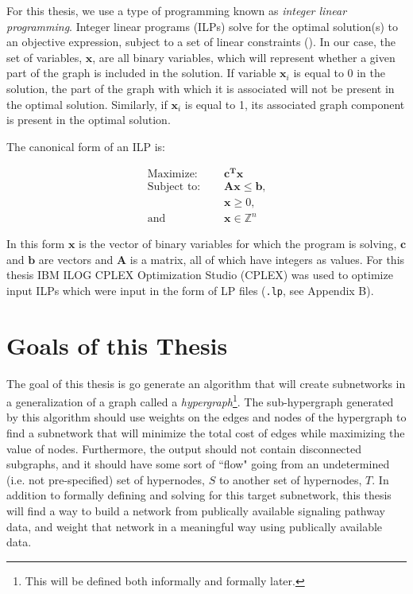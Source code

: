 \documentclass[12pt,twoside]{reedthesis}
\theoremstyle{definition}
\begin{document}
{  For this thesis, we use a type of programming known as \textit{integer linear programming}. Integer linear programs (ILPs) solve for the optimal solution(s) to an objective expression, subject to a set of linear constraints (\cite{Papadimitriou1998}). In our case, the set of variables, $\mathbf{x}$, are all binary variables, which will represent whether a given part of the graph is included in the solution. If variable $\mathbf{x}_i$ is equal to 0 in the solution, the part of the graph with which it is associated will not be present in the optimal solution. Similarly, if $\mathbf{x}_i$ is equal to 1, its associated graph component is present in the optimal solution.\par

  The canonical form of an ILP is:\par


  \begin{align}
    \text{Maximize: }\quad&\mathbf{c^Tx}\label{eq:obj_canonical}\\
    \text{Subject to: }\quad&\mathbf{Ax}\leq\mathbf{b}\text{,}\label{eq:constA}\\
    &\mathbf{x} \geq 0 \text{,}\label{eq:constB}\\
    \text{and } \quad & \mathbf{x} \in \mathbb{Z}^n \label{eq:constC}
  \end{align}

  In this form $\mathbf{x}$ is the vector of binary variables for which the program is solving, $\mathbf{c}$ and $\mathbf{b}$ are vectors and $\mathbf{A}$ is a matrix, all of which have integers as values. For this thesis IBM ILOG CPLEX Optimization Studio (CPLEX) was used to optimize input ILPs which were input in the form of LP files (\texttt{.lp}, see Appendix B).

 \section{Goals of this Thesis}

 The goal of this thesis is go generate an algorithm that will create subnetworks in a generalization of a graph called a \textit{hypergraph}\footnote{This will be defined both informally and formally later.}. The sub-hypergraph generated by this algorithm should use weights on the edges and nodes of the hypergraph to find a subnetwork that will minimize the total cost of edges while maximizing the value of nodes. Furthermore, the output should not contain disconnected subgraphs, and it should have some sort of ``flow" going from an undetermined (i.e. not pre-specified) set of hypernodes, $S$ to another set of hypernodes, $T$. In addition to formally defining and solving for this target subnetwork, this thesis will find a way to build a network from publically available signaling pathway data, and weight that network in a meaningful way using publically available data.\par

}
\end{document}
